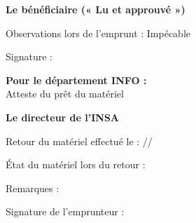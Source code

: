 \documentclass[12pt,a4paper]{article}
\begin{document}
\vspace{0.5cm}

\textbf{Le bénéficiaire (« Lu et approuvé »)} 

\vspace{0.4cm}

Observations lors de l’emprunt : Impécable

\vspace{0.4cm}

Signature :

\vspace{0.3cm}

\begin{minipage}{0.5\linewidth} 
\end{minipage} 
\hfill 
\begin{minipage}{0.5\linewidth} 
\textbf{Pour le département INFO :} \\[0.3cm] 
Atteste du prêt du matériel \\[0.4cm] 
\begin{center} 
\textbf{Le directeur de l’INSA} \\ 
\end{center} 
\end{minipage}

\vspace{1.2cm}

Retour du matériel effectué le : \underline{\hspace{2cm}}/\underline{\hspace{2cm}}/\underline{\hspace{2cm}}

\vspace{0.5cm}

État du matériel lors du retour : \\

\vspace{0.25cm}

Remarques : \\

\vspace{0.4cm}

Signature de l’emprunteur :
\end{document}

